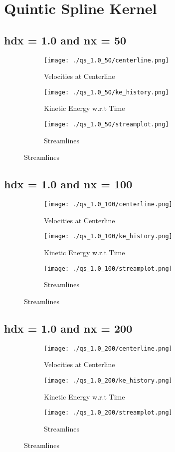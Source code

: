\documentclass[12pt, a4paper]{report}
\begin{document}
\section{Quintic Spline Kernel}
\subsection{hdx = 1.0 and nx = 50}
\begin{figure}[H]
\begin{subfigure}{0.5\textwidth}
	\texttt{[image: ./qs\_1.0\_50/centerline.png]}
	\caption{Velocities at Centerline}
\end{subfigure}
\begin{subfigure}{0.5\textwidth}
	\texttt{[image: ./qs\_1.0\_50/ke\_history.png]}
	\caption{Kinetic Energy w.r.t Time}
\end{subfigure}
\medskip
\begin{subfigure}{\textwidth}
	\centering
	\texttt{[image: ./qs\_1.0\_50/streamplot.png]}
	\caption{Streamlines}
\end{subfigure}
\end{figure}

\subsection{hdx = 1.0 and nx = 100}
\begin{figure}[H]
\begin{subfigure}{0.5\textwidth}
	\texttt{[image: ./qs\_1.0\_100/centerline.png]}
	\caption{Velocities at Centerline}
\end{subfigure}
\begin{subfigure}{0.5\textwidth}
	\texttt{[image: ./qs\_1.0\_100/ke\_history.png]}
	\caption{Kinetic Energy w.r.t Time}
\end{subfigure}
\medskip
\begin{subfigure}{\textwidth}
	\texttt{[image: ./qs\_1.0\_100/streamplot.png]}
	\caption{Streamlines}
\end{subfigure}
\end{figure}

\subsection{hdx = 1.0 and nx = 200}
\begin{figure}[H]
\begin{subfigure}{0.5\textwidth}
	\texttt{[image: ./qs\_1.0\_200/centerline.png]}
	\caption{Velocities at Centerline}
\end{subfigure}
\begin{subfigure}{0.5\textwidth}
	\texttt{[image: ./qs\_1.0\_200/ke\_history.png]}
	\caption{Kinetic Energy w.r.t Time}
\end{subfigure}
\medskip
\begin{subfigure}{\textwidth}
	\texttt{[image: ./qs\_1.0\_200/streamplot.png]}
	\caption{Streamlines}
\end{subfigure}
\end{figure}
\end{document}
